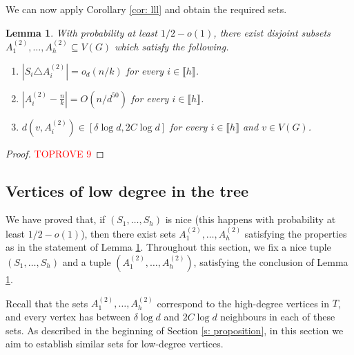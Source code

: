 \documentclass[notitlepage]{scrartcl}
\newcommand{\br}[1]{\llbracket{#1}\rrbracket}
\newtheorem{lemma}[thm]{Lemma}
\begin{document}
We can now apply Corollary \ref{cor: lll} and obtain the required sets.
\begin{lemma}\label{l: second lll}
With probability at least $1/2-o(1)$, there exist disjoint subsets $A_1^{(2)},\ldots, A_h^{(2)}\subseteq V(G)$ which satisfy the following.
\begin{enumerate}
    \item $\left|S_i\triangle A_i^{(2)}\right|=o_d(n/k)$ for every $i\in \br{h}$.
    \item $\left|A_i^{(2)}-\frac{n}{k}\right|=O(n/d^{50})$ for every $i\in \br{h}$. 
    \item $d(v, A_i^{(2)})\in \left[\delta \log d, 2C\log d\right]$ for every $i\in \br{h}$ and $v\in V(G)$.
\end{enumerate}
\end{lemma}
\begin{proof}\textcolor{red}{TOPROVE 9}\end{proof}

\subsection{Vertices of low degree in the tree}\label{s: low degree}

We have proved that, if $(S_1,\ldots,S_h)$ is nice (this happens with probability at least $1/2-o(1)$), then there exist sets $A_1^{(2)},\ldots, A_h^{(2)}$ satisfying the properties as in the statement of Lemma \ref{l: second lll}.
Throughout this section, we fix a nice tuple $(S_1,\ldots,S_h)$ and a tuple $(A_1^{(2)},\ldots,A_h^{(2)})$, satisfying the conclusion of Lemma \ref{l: second lll}.



Recall that the sets $A_1^{(2)},\ldots, A_h^{(2)}$ correspond to the high-degree vertices in $T$, and every vertex has between $\delta\log d$ and $2C\log d$ neighbours in each of these sets. As described in the beginning of Section \ref{s: proposition}, in this section we aim to establish similar sets for low-degree vertices.
\end{document}
